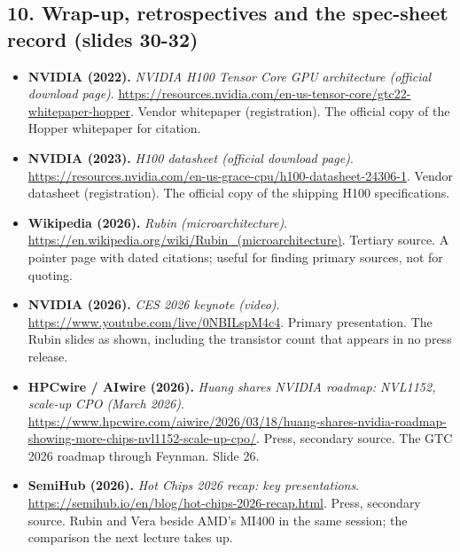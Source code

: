 \documentclass[11pt,letterpaper]{article}
\begin{document}
\subsection*{10. Wrap-up, retrospectives and the spec-sheet record (slides 30-32)}
\begin{itemize}[leftmargin=1.2em,itemsep=3pt]\sloppy
\item \textbf{NVIDIA (2022).} \textit{NVIDIA H100 Tensor Core GPU architecture (official download page)}. \url{https://resources.nvidia.com/en-us-tensor-core/gtc22-whitepaper-hopper}. Vendor whitepaper (registration). The official copy of the Hopper whitepaper for citation.
\item \textbf{NVIDIA (2023).} \textit{H100 datasheet (official download page)}. \url{https://resources.nvidia.com/en-us-grace-cpu/h100-datasheet-24306-1}. Vendor datasheet (registration). The official copy of the shipping H100 specifications.
\item \textbf{Wikipedia (2026).} \textit{Rubin (microarchitecture)}. \url{https://en.wikipedia.org/wiki/Rubin_(microarchitecture)}. Tertiary source. A pointer page with dated citations; useful for finding primary sources, not for quoting.
\item \textbf{NVIDIA (2026).} \textit{CES 2026 keynote (video)}. \url{https://www.youtube.com/live/0NBILspM4c4}. Primary presentation. The Rubin slides as shown, including the transistor count that appears in no press release.
\item \textbf{HPCwire / AIwire (2026).} \textit{Huang shares NVIDIA roadmap: NVL1152, scale-up CPO (March 2026)}. \url{https://www.hpcwire.com/aiwire/2026/03/18/huang-shares-nvidia-roadmap-showing-more-chips-nvl1152-scale-up-cpo/}. Press, secondary source. The GTC 2026 roadmap through Feynman. Slide 26.
\item \textbf{SemiHub (2026).} \textit{Hot Chips 2026 recap: key presentations}. \url{https://semihub.io/en/blog/hot-chips-2026-recap.html}. Press, secondary source. Rubin and Vera beside AMD's MI400 in the same session; the comparison the next lecture takes up.
\end{itemize}
\clearpage
\printindex
\end{document}
